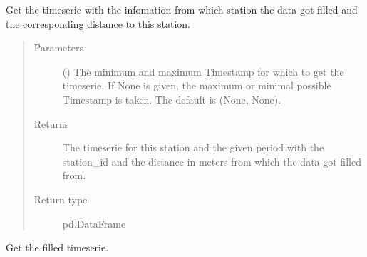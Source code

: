 \documentclass[letterpaper,10pt,english]{sphinxmanual}
\begin{document}
\begin{fulllineitems}
\begin{fulllineitems}
\label{\detokenize{weatherDB:weatherDB.station.StationBase.get_dist}}
\sphinxAtStartPar
Get the timeserie with the infomation from which station the data got filled and the corresponding distance to this station.
\begin{quote}\begin{description}
\item[{Parameters}] \leavevmode
\sphinxAtStartPar
{} ({\hyperref[\detokenize{weatherDB.lib:weatherDB.lib.utils.TimestampPeriod}]{}}\sphinxstyleliteralemphasis{\sphinxupquote{(}}\sphinxstyleliteralemphasis{\sphinxupquote{)}}\sphinxstyleliteralemphasis{\sphinxupquote{, }}) \textendash{} The minimum and maximum Timestamp for which to get the timeserie.
If None is given, the maximum or minimal possible Timestamp is taken.
The default is (None, None).

\item[{Returns}] \leavevmode
\sphinxAtStartPar
The timeserie for this station and the given period with the station\_id and the distance in meters from which the data got filled from.

\item[{Return type}] \leavevmode
\sphinxAtStartPar
pd.DataFrame

\end{description}\end{quote}

\end{fulllineitems}


\begin{fulllineitems}
\label{\detokenize{weatherDB:weatherDB.station.StationBase.get_filled}}
\sphinxAtStartPar
Get the filled timeserie.


\end{fulllineitems}
\end{fulllineitems}
\end{document}
